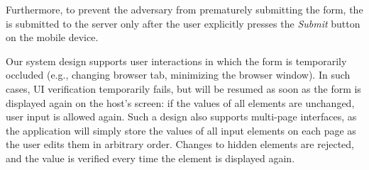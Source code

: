  Furthermore, to prevent the adversary from prematurely submitting the form, the \POI is submitted to the server only after the user explicitly presses the \emph{Submit} button on the mobile device.


Our system design supports user interactions in which the form is temporarily occluded (e.g., changing browser tab, minimizing the browser window).
In such cases, UI verification temporarily fails, but will be resumed as soon as the form is displayed again on the host's screen: if the values of all elements are unchanged, user input is allowed again. Such a design also supports multi-page interfaces, as the application will simply store the values of all input elements on each page as the user edits them in arbitrary order. Changes to hidden elements are rejected, and the value is verified every time the element is displayed again.